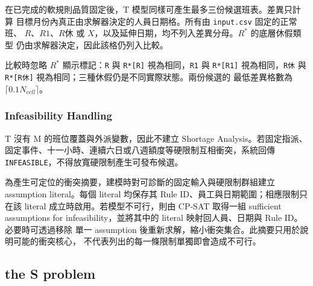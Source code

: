 \documentclass[12pt]{article}
\begin{document}
在已完成的軟規則品質固定後，T 模型同樣可產生最多三份候選班表。差異只計算
目標月份內真正由求解器決定的人員日期格。所有由 \texttt{input.csv} 固定的正常班、
\(R\)、\(R1\)、\(R休\) 或 \(X\)，以及延伸日期，均不列入差異分母。\(R^*\) 的底層休假類型
仍由求解器決定，因此該格仍列入比較。

比較時忽略 \(R^*\) 顯示標記：\texttt{R} 與 \texttt{R*[R]} 視為相同，\texttt{R1}
與 \texttt{R*[R1]} 視為相同，\texttt{R休} 與 \texttt{R*[R休]} 視為相同；三種休假仍是不同實際狀態。兩份候選的
最低差異格數為 \(\lceil0.1N_{cell}\rceil\)。

\subsubsection{Infeasibility Handling}

T 沒有 M 的班位覆蓋與外派變數，因此不建立 Shortage Analysis。若固定指派、
固定事件、十一小時、連續六日或八週額度等硬限制互相衝突，系統回傳
\texttt{INFEASIBLE}，不得放寬硬限制產生可發布候選。

為產生可定位的衝突摘要，建模時對可診斷的固定輸入與硬限制群組建立 assumption
literal。每個 literal 均保存其 Rule ID、員工與日期範圍；相應限制只在該 literal
成立時啟用。若模型不可行，則由 CP-SAT 取得一組 sufficient assumptions for
infeasibility，並將其中的 literal 映射回人員、日期與 Rule ID。必要時可透過移除
單一 assumption 後重新求解，縮小衝突集合。此摘要只用於說明可能的衝突核心，
不代表列出的每一條限制單獨即會造成不可行。

\subsection{the S problem}

\end{document}
